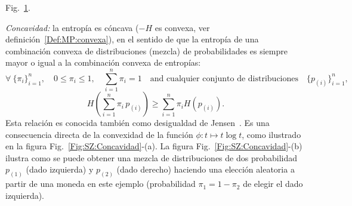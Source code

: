 \begin{propiedades}
  Fig.~\ref{Fig:SZ:Recursividad}.\newline
  \begin{figure}[h!]
  \begin{center}  \end{center}
  \label{Fig:SZ:Recursividad}
  \end{figure}
%
\setcounter{PropConcavidad}{\value{enumi}}
\item\label{Prop:SZ:concavidad}  {\it Concavidad:}  la  entrop\'ia es  c\'oncava
  ($-H$ es convexa, ver definici\'on~\ref{Def:MP:convexa}),
  en  el  sentido  de  que   la  entrop\'ia  de  una  combinaci\'on  convexa  de
  distribuciones  (mezcla) de  probabilidades  es  siempre mayor  o  igual a  la
  combinaci\'on convexa de entrop\'ias:
  \[
  \forall \:  \{ \pi_i \}_{i=1}^n, \quad  0 \le \pi_i \le  1, \quad \sum_{i=1}^n
  \pi_i  = 1  \quad \mbox{and  cualquier  conjunto de  distribuciones} \quad  \{
  p_{(i)} \}_{i=1}^n,
  \]
  \[
  H\left( \sum_{i=1}^n \pi_i \, p_{(i)} \right) \ge \sum_{i=1}^n \pi_i H(p_{(i)}).
  \]
  Esta relaci\'on es conocida tambi\'en como desigualdad de Jensen~\cite{Jen06}.
  Es una consecuencia directa de la  convexidad de la funci\'on $\phi: t \mapsto
  t \log  t$, como ilustrado en la  figura Fig.~\ref{Fig:SZ:Concavidad}-(a).  La
  figura  Fig.~\ref{Fig:SZ:Concavidad}-(b)  ilustra como  se  puede obtener  una
  mezcla  de distribuciones  de dos  probabilidad $p_{(1)}$  (dado  izquierda) y
  $p_{(2)}$ (dado  derecho) haciendo  una elecci\'on aleatoria  a partir  de una
  moneda en  este ejemplo (probabilidad  $\pi_1 = 1  - \pi_2$ de elegir  el dado
  izquierda).\newline
  \begin{figure}[h!]
  \begin{center}  \end{center}
\end{figure}
\end{propiedades}
